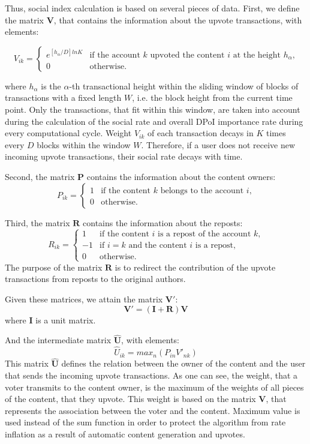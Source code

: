 \documentclass[a4paper,12pt]{article}
\begin{document}
Thus, social index calculation is based on several pieces of data. First, we define the matrix $\boldsymbol{V}$, that contains the information about the upvote transactions, with elements:
	
	$$	
	V_{ik} = \begin{cases}
	 e^{[h_\alpha/D]ln K}
	 & \text{if the account $k$ upvoted the content $i$ at the height $h_\alpha$,}\\
	 0 & \text{otherwise.}
	\end{cases}
	$$
	
	where $h_\alpha$ is the $\alpha$-th transactional height within the sliding window of blocks of transactions with a fixed length $W$, i.e. the block height from the current time point. Only the transactions, that fit within this window, are taken into account during the calculation of the social rate and overall DPoI importance rate during every computational cycle. Weight $V_{ik}$ of each transaction decays in $K$ times every $D$ blocks within the window $W$. Therefore, if a user does not receive new incoming upvote transactions, their social rate decays with time.
	
	Second, the matrix $\boldsymbol{P}$ contains the information about the content owners:
	$$
	P_{ik} = \begin{cases}
	 1
	 & \text{if the content $k$ belongs to the account $i$,}\\
	 0 & \text{otherwise.}
	\end{cases}
	$$
	
	Third, the matrix $\boldsymbol{R}$ contains the information about the reposts:
	$$
	R_{ik} = \begin{cases}
	 1 & \text{if the content $i$ is a repost of the account $k$,}\\
	 -1 & \text{if $i=k$ and the content $i$ is a repost,}\\
	 0 & \text{otherwise.}
	\end{cases}
	$$
	The purpose of the matrix $\boldsymbol{R}$ is to redirect the contribution of the upvote transactions from reposts to the original authors. 
	
	Given these matrices, we attain the matrix $\boldsymbol{V'}$:
	$$
\boldsymbol{V'} = ( \boldsymbol{I} + \boldsymbol{R} ) \boldsymbol{V}
$$
	where $\boldsymbol{I}$ is a unit matrix.
	
	And the intermediate matrix $\boldsymbol{\hat{U}}$, with elements:
	$$
	\hat{U}_{ik} = max_n(P_{in} V'_{nk})
	$$
	This matrix $\boldsymbol{\hat{U}}$ defines the relation between the owner of the content and the user that sends the incoming upvote transactions. As one can see, the weight, that a voter transmits to the content owner, is the maximum of the weights of all pieces of the content, that they upvote. This weight is based on the matrix $\boldsymbol{V}$, that represents the association between the voter and the content. Maximum value is used instead of the sum function in order to protect the algorithm from rate inflation as a result of automatic content generation and upvotes.
	
\end{document}
